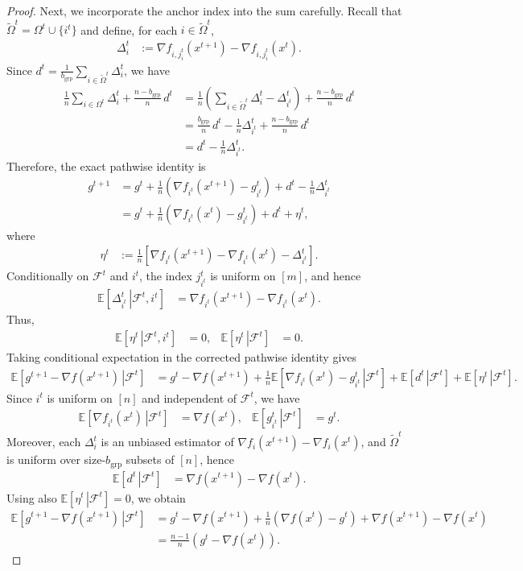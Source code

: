 \documentclass{article}
\newcommand{\eqdef}{:=}
\newcommand{\Expb}[2]{\mathbb{E}\!\left[\left. #1\,\right|#2 \right]}
\newcommand{\Expc}[1]{\Expb{#1}{\mathcal{F}^t}}
\theoremstyle{plain}
\begin{document}
\begin{proof}
Next, we incorporate the anchor index into the sum carefully. Recall that $\tilde{\Omega}^t=\Omega^t\cup\{i^t\}$ and define, for each $i\in\tilde{\Omega}^t$,
\begin{align*}
\Delta_i^t
&\eqdef
\nabla f_{i,j_i^t}(x^{t+1})-\nabla f_{i,j_i^t}(x^{t}).
\end{align*}
Since $d^t=\frac{1}{b_{\mathrm{grp}}}\sum_{i\in\tilde{\Omega}^t}\Delta_i^t$, we have
\begin{align*}
\frac{1}{n}\sum_{i\in\Omega^t}\Delta_i^t+\frac{n-b_{\mathrm{grp}}}{n}\,d^t
&=
\frac{1}{n}\left(\sum_{i\in\tilde{\Omega}^t}\Delta_i^t-\Delta_{i^t}^t\right)
+\frac{n-b_{\mathrm{grp}}}{n}\,d^t
\\
&=
\frac{b_{\mathrm{grp}}}{n}\,d^t-\frac{1}{n}\Delta_{i^t}^t+\frac{n-b_{\mathrm{grp}}}{n}\,d^t
\\
&=
d^t-\frac{1}{n}\Delta_{i^t}^t.
\end{align*}
Therefore, the exact pathwise identity is
\begin{align*}
g^{t+1}
&=
g^t
+\frac{1}{n}\left(\nabla f_{i^t}(x^{t+1})-g_{i^t}^t\right)
+d^t
-\frac{1}{n}\Delta_{i^t}^t
\\
&=
g^t
+\frac{1}{n}\left(\nabla f_{i^t}(x^{t})-g_{i^t}^t\right)
+d^t+\eta^t,
\end{align*}
where
\begin{align*}
\eta^t
&\eqdef
\frac{1}{n}\left[
\nabla f_{i^t}(x^{t+1})-\nabla f_{i^t}(x^t)-\Delta_{i^t}^t
\right].
\end{align*}
Conditionally on $\mathcal{F}^t$ and $i^t$, the index $j_{i^t}^t$ is uniform on $[m]$, and hence
\begin{align*}
\Expb{\Delta_{i^t}^t}{\mathcal{F}^t,i^t}
&=
\nabla f_{i^t}(x^{t+1})-\nabla f_{i^t}(x^t).
\end{align*}
Thus,
\begin{align*}
\Expb{\eta^t}{\mathcal{F}^t,i^t}
&=0,
&
\Expc{\eta^t}
&=0.
\end{align*}
Taking conditional expectation in the corrected pathwise identity gives
\begin{align*}
\Expc{g^{t+1}-\nabla f(x^{t+1})}
&=
g^t-\nabla f(x^{t+1})
+\frac{1}{n}\Expb{\nabla f_{i^t}(x^t)-g_{i^t}^t}{\mathcal{F}^t}
+\Expc{d^t}
+\Expc{\eta^t}.
\end{align*}
Since $i^t$ is uniform on $[n]$ and independent of $\mathcal{F}^t$, we have
\begin{align*}
\Expb{\nabla f_{i^t}(x^t)}{\mathcal{F}^t}
&=
\nabla f(x^t),
&
\Expb{g_{i^t}^t}{\mathcal{F}^t}
&=
g^t.
\end{align*}
Moreover, each $\Delta_i^t$ is an unbiased estimator of $\nabla f_i(x^{t+1})-\nabla f_i(x^t)$, and $\tilde{\Omega}^t$ is uniform over size-$b_{\mathrm{grp}}$ subsets of $[n]$, hence
\begin{align*}
\Expc{d^t}
&=
\nabla f(x^{t+1})-\nabla f(x^t).
\end{align*}
Using also $\Expc{\eta^t}=0$, we obtain
\begin{align*}
\Expc{g^{t+1}-\nabla f(x^{t+1})}
&=
g^t-\nabla f(x^{t+1})
+\frac{1}{n}\left(\nabla f(x^t)-g^t\right)
+\nabla f(x^{t+1})-\nabla f(x^t)
\\
&=
\frac{n-1}{n}\left(g^t-\nabla f(x^t)\right).
\end{align*}


\end{proof}
\end{document}
